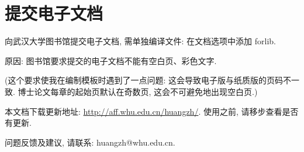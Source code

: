 \section{提交电子文档}

向武汉大学图书馆提交电子文档, 需单独编译文件: 在文档选项中添加 forlib.

原因: 图书馆要求提交的电子文档不能有空白页、彩色文字.

({\kaishu 这个要求使我在编制模板时遇到了一点问题: 这会导致电子版与纸质版的页码不一致. 博士论文每章的起始页默认在奇数页, 这会不可避免地出现空白页.})


\vfill

本文档下载更新地址: \url{http://aff.whu.edu.cn/huangzh/}. 使用之前, 请移步查看是否有更新.

问题反馈及建议, 请联系: huangzh@whu.edu.cn.

